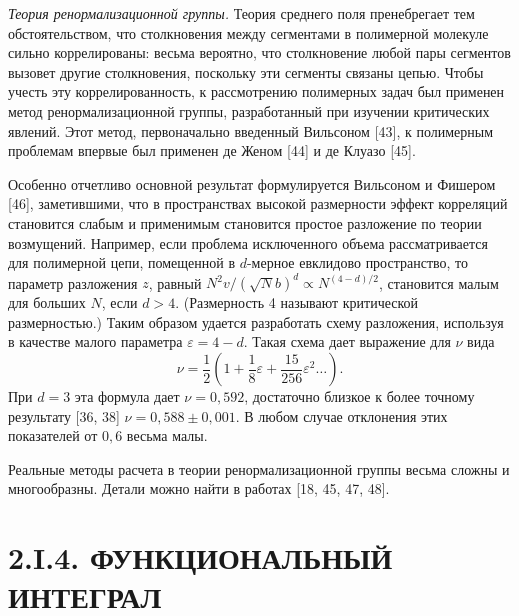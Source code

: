 \documentclass[12pt,a4paper]{article}
\begin{document}
\textit{Теория ренормализационной группы.} Теория среднего поля пренебрегает тем обстоятельством, что столкновения между сегментами в полимерной молекуле сильно коррелированы: весьма вероятно, что столкновение любой пары сегментов вызовет другие столкновения, поскольку эти сегменты связаны цепью. Чтобы учесть эту коррелированность, к рассмотрению полимерных задач был применен метод ренормализационной группы, разработанный при изучении критических явлений. Этот метод, первоначально введенный Вильсоном [43], к полимерным проблемам впервые был применен де Женом [44] и де Клуазо [45].

Особенно отчетливо основной результат формулируется Вильсоном и Фишером [46], заметившими, что в пространствах высокой размерности эффект корреляций становится слабым и применимым становится простое разложение по теории возмущений. Например, если проблема исключенного объема рассматривается для полимерной цепи, помещенной в $d$-мерное евклидово пространство, то параметр разложения $z$, равный $N^2 v / (\sqrt{N}b)^d \propto N^{(4-d)/2}$, становится малым для больших $N$, если $d > 4$. (Размерность 4 называют критической размерностью.) Таким образом удается разработать схему разложения, используя в качестве малого параметра $\varepsilon = 4 - d$. Такая схема дает выражение для $\nu$ вида
\begin{equation}
\nu = \frac{1}{2}\left(1 + \frac{1}{8}\varepsilon + \frac{15}{256}\varepsilon^2 \dots\right). \tag{2.119}
\end{equation}
При $d = 3$ эта формула дает $\nu = 0{,}592$, достаточно близкое к более точному результату [36, 38] $\nu = 0{,}588 \pm 0{,}001$. В любом случае отклонения этих показателей от $0{,}6$ весьма малы.

Реальные методы расчета в теории ренормализационной группы весьма сложны и многообразны. Детали можно найти в работах [18, 45, 47, 48].

\section*{2.I.4. ФУНКЦИОНАЛЬНЫЙ ИНТЕГРАЛ}
\end{document}
